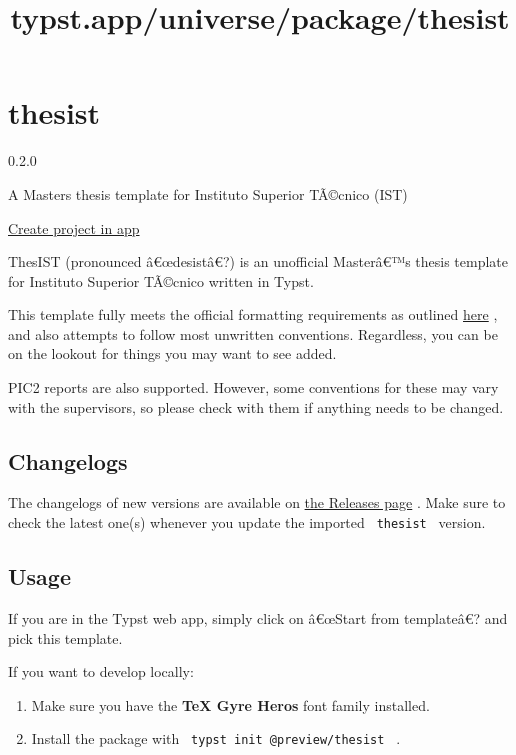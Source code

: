 \title{typst.app/universe/package/thesist}

\label{banner}
\label{template-thumbnail}

\section{thesist}\label{thesist}

{ 0.2.0 }

A Master\textquotesingle s thesis template for Instituto Superior
TÃ©cnico (IST)

\href{/app?template=thesist&version=0.2.0}{Create project in app}

\label{readme}
ThesIST (pronounced â€œdesistâ€?) is an unofficial Masterâ€™s thesis
template for Instituto Superior TÃ©cnico written in Typst.

This template fully meets the official formatting requirements as
outlined
\href{https://tecnico.ulisboa.pt/files/2021/09/guia-disserta-o-mestrado.pdf}{here}
, and also attempts to follow most unwritten conventions. Regardless,
you can be on the lookout for things you may want to see added.

PIC2 reports are also supported. However, some conventions for these may
vary with the supervisors, so please check with them if anything needs
to be changed.

\subsection{Changelogs}\label{changelogs}

The changelogs of new versions are available on
\href{https://github.com/tfachada/thesist/releases}{the Releases page} .
Make sure to check the latest one(s) whenever you update the imported
\texttt{\ thesist\ } version.

\subsection{Usage}\label{usage}

If you are in the Typst web app, simply click on â€œStart from
templateâ€? and pick this template.

If you want to develop locally:

\begin{enumerate}
\tightlist
\item
  Make sure you have the \textbf{TeX Gyre Heros} font family installed.
\item
  Install the package with \texttt{\ typst\ init\ @preview/thesist\ } .
\end{enumerate}

